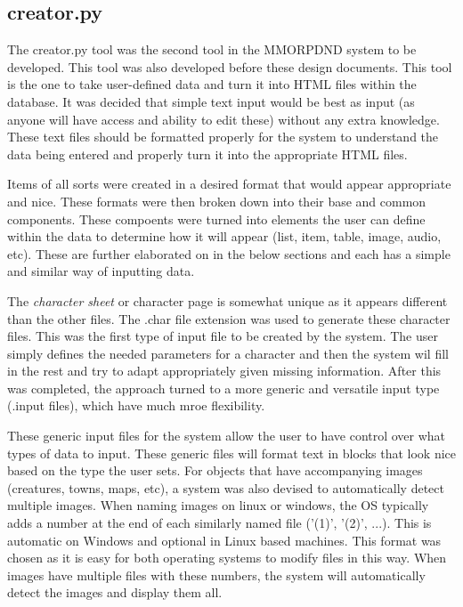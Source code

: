 \subsection{creator.py}

The creator.py tool was the second tool in the MMORPDND system to be developed. This tool was also developed before these design documents. This tool is the one to take user-defined data and turn it into HTML files within the database. It was decided that simple text input would be best as input (as anyone will have access and ability to edit these) without any extra knowledge. These text files should be formatted properly for the system to understand the data being entered and properly turn it into the appropriate HTML files. 

Items of all sorts were created in a desired format that would appear appropriate and nice. These formats were then broken down into their base and common components. These compoents were turned into elements the user can define within the data to determine how it will appear (list, item, table, image, audio, etc). These are further elaborated on in the below sections and each has a simple and similar way of inputting data.

The \textit{character sheet} or character page is somewhat unique as it appears different than the other files. The .char file extension was used to generate these character files. This was the first type of input file to be created by the system. The user simply defines the needed parameters for a character and then the system wil fill in the rest and try to adapt appropriately given missing information. After this was completed, the approach turned to a more generic and versatile input type (.input files), which have much mroe flexibility. 

These generic input files for the system allow the user to have control over what types of data to input. These generic files will format text in blocks that look nice based on the type the user sets. For objects that have accompanying images (creatures, towns, maps, etc), a system was also devised to automatically detect multiple images. When naming images on linux or windows, the OS typically adds a number at the end of each similarly named file ('(1)', '(2)', ...). This is automatic on Windows and optional in Linux based machines. This format was chosen as it is easy for both operating systems to modify files in this way. When images have multiple files with these numbers, the system will automatically detect the images and display them all. 

